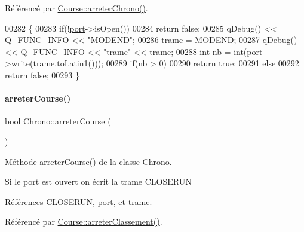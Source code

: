 Référencé par \hyperlink{class_course_a939635ac8301a7018475cc2ce347375f}{Course\+::arreter\+Chrono()}.


\begin{DoxyCode}
00282 \{
00283     \textcolor{keywordflow}{if}(!\hyperlink{class_chrono_aca5fbe0eebd7f876f954d4a99c564167}{port}->isOpen())
00284         \textcolor{keywordflow}{return} \textcolor{keyword}{false};
00285     qDebug() << Q\_FUNC\_INFO << \textcolor{stringliteral}{"MODEND"};
00286     \hyperlink{class_chrono_a26f2155aa6e5ef4296e5456b64a713b5}{trame} = \hyperlink{chrono_8h_a95708e00882b95a7b2d68b2f75c3913c}{MODEND};
00287     qDebug() << Q\_FUNC\_INFO << \textcolor{stringliteral}{"trame"} << \hyperlink{class_chrono_a26f2155aa6e5ef4296e5456b64a713b5}{trame};
00288     \textcolor{keywordtype}{int} nb = int(\hyperlink{class_chrono_aca5fbe0eebd7f876f954d4a99c564167}{port}->write(trame.toLatin1()));
00289     \textcolor{keywordflow}{if}(nb > 0)
00290         \textcolor{keywordflow}{return} \textcolor{keyword}{true};
00291     \textcolor{keywordflow}{else}
00292         \textcolor{keywordflow}{return} \textcolor{keyword}{false};
00293 \}
\end{DoxyCode}
\mbox{\label{class_chrono_a2a0d899b09eb044caa83b41574ac5edf}} 
\paragraph{\texorpdfstring{arreter\+Course()}{arreterCourse()}}
{\footnotesize\ttfamily bool Chrono\+::arreter\+Course (\begin{DoxyParamCaption}{ }\end{DoxyParamCaption})}



Méthode \hyperlink{class_chrono_a2a0d899b09eb044caa83b41574ac5edf}{arreter\+Course()} de la classe \hyperlink{class_chrono}{Chrono}. 

Si le port est ouvert on écrit la trame C\+L\+O\+S\+E\+R\+UN 

Références \hyperlink{chrono_8h_aadc6271993e3725db8c6640289f8d2bb}{C\+L\+O\+S\+E\+R\+UN}, \hyperlink{class_chrono_aca5fbe0eebd7f876f954d4a99c564167}{port}, et \hyperlink{class_chrono_a26f2155aa6e5ef4296e5456b64a713b5}{trame}.



Référencé par \hyperlink{class_course_a4426310a411d8ecf7f4a2dc64c24a42d}{Course\+::arreter\+Classement()}.


